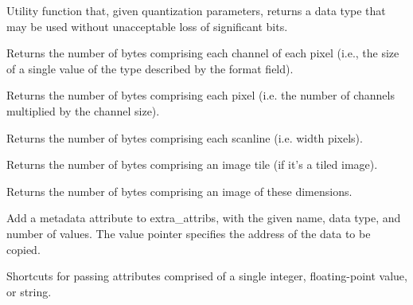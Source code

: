 Utility function that, given quantization parameters, returns a data
type that may be used without unacceptable loss of significant bits.
\apiend

Returns the number of bytes comprising each channel of each pixel (i.e.,
the size of a single value of the type described by the {\cf format} field).
\apiend

Returns the number of bytes comprising each pixel (i.e. the number of
channels multiplied by the channel size).
\apiend

Returns the number of bytes comprising each scanline (i.e. {\cf width} pixels).
\apiend

Returns the number of bytes comprising an image tile (if it's a tiled image).
\apiend

Returns the number of bytes comprising an image of these dimensions.
\apiend


Add a metadata attribute to {\cf extra_attribs}, with the given name,
data type, and number of values.  The {\cf value} pointer specifies
the address of the data to be copied.
\apiend

Shortcuts for passing attributes comprised of a single integer,
floating-point value, or string.
\apiend


